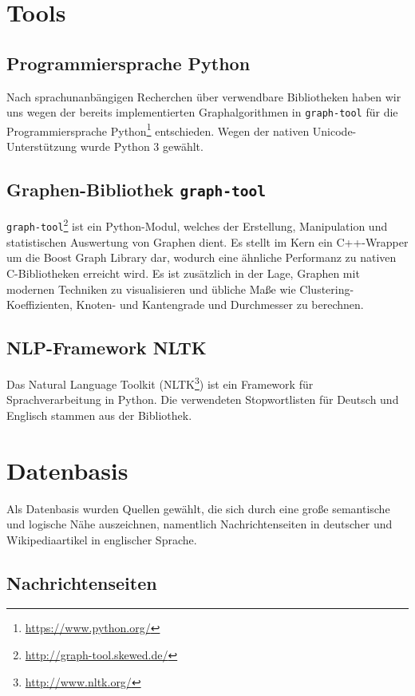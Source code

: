 \documentclass[11pt, a4paper]{article}
\begin{document}
\section{Tools}

\subsection{Programmiersprache Python}
Nach sprachunanbängigen Recherchen über verwendbare Bibliotheken haben wir uns wegen der bereits implementierten Graphalgorithmen in \texttt{graph-tool} für die Programmiersprache Python\footnote{\url{https://www.python.org/}} entschieden. Wegen der nativen Unicode-Unterstützung wurde Python 3 gewählt.

\subsection{Graphen-Bibliothek \texttt{graph-tool}}
\texttt{graph-tool}\footnote{\url{http://graph-tool.skewed.de/}} ist ein Python-Modul,
welches der Erstellung, Manipulation und statistischen
Auswertung von Graphen dient. Es stellt im Kern ein C++-Wrapper um die Boost
Graph Library dar, wodurch eine \"ahnliche Performanz zu nativen C-Bibliotheken
erreicht wird. Es ist zus\"atzlich in der Lage, Graphen mit modernen Techniken
zu visualisieren und \"ubliche Ma\ss{}e wie Clustering-Koeffizienten, Knoten-
und Kantengrade und Durchmesser zu berechnen.

\subsection{NLP-Framework NLTK}
Das Natural Language Toolkit (NLTK\footnote{\url{http://www.nltk.org/}}) ist ein Framework f\"ur Sprachverarbeitung in Python.
Die verwendeten Stopwortlisten für Deutsch und Englisch stammen aus der Bibliothek.


\section{Datenbasis}

Als Datenbasis wurden Quellen gew\"ahlt, die sich durch eine gro\ss{}e
semantische und logische N\"ahe auszeichnen, namentlich Nachrichtenseiten in
deutscher und Wikipediaartikel in englischer Sprache.

\subsection{Nachrichtenseiten}
\label{nrseiten}
\end{document}
